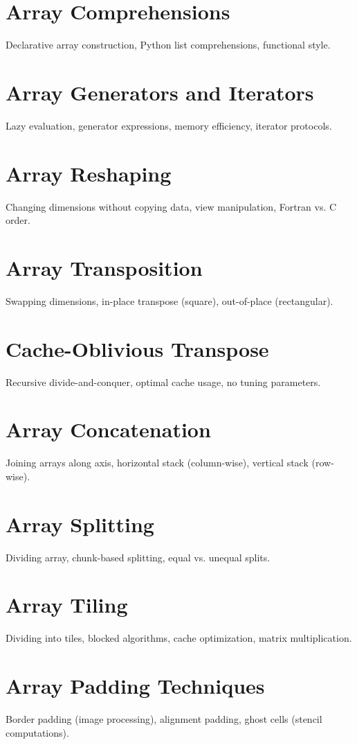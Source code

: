 \chapter{Array Comprehensions}
Declarative array construction, Python list comprehensions, functional style.

\chapter{Array Generators and Iterators}
Lazy evaluation, generator expressions, memory efficiency, iterator protocols.

\chapter{Array Reshaping}
Changing dimensions without copying data, view manipulation, Fortran vs. C order.

\chapter{Array Transposition}
Swapping dimensions, in-place transpose (square), out-of-place (rectangular).

\chapter{Cache-Oblivious Transpose}
Recursive divide-and-conquer, optimal cache usage, no tuning parameters.

\chapter{Array Concatenation}
Joining arrays along axis, horizontal stack (column-wise), vertical stack (row-wise).

\chapter{Array Splitting}
Dividing array, chunk-based splitting, equal vs. unequal splits.

\chapter{Array Tiling}
Dividing into tiles, blocked algorithms, cache optimization, matrix multiplication.

\chapter{Array Padding Techniques}
Border padding (image processing), alignment padding, ghost cells (stencil computations).


